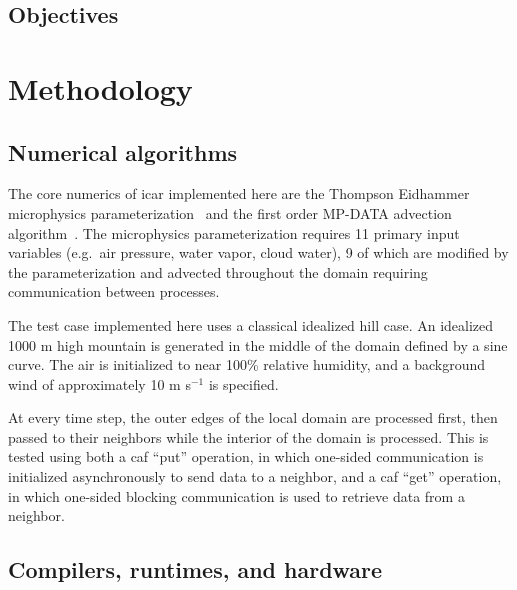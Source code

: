 \subsection{Objectives}

\section{Methodology}
\subsection{Numerical algorithms}
The core numerics of \gls{icar} implemented here are the Thompson Eidhammer microphysics parameterization~\cite{Thompson:2014cw} and the first order MP-DATA advection algorithm~\cite{Smolarkiewicz:1998il}.  
The microphysics parameterization requires 11 primary input variables (e.g.\ air pressure, water vapor, cloud water), 9 of which are modified by the parameterization and advected throughout the domain requiring communication between processes. 

The test case implemented here uses a classical idealized hill case.  
An idealized 1000 m high mountain is generated in the middle of the domain defined by a sine curve. 
The air is initialized to near 100\% relative humidity, and a background wind of approximately 10 m s$^{-1}$ is specified. 

At every time step, the outer edges of the local domain are processed first, 
then passed to their neighbors while the interior of the domain is processed.  
This is tested using both a \gls{caf} ``put'' operation, in which one-sided communication is initialized asynchronously to send data to a neighbor, 
and a \gls{caf} ``get'' operation, in which one-sided blocking communication is used to retrieve data from a neighbor. 

\subsection{Compilers, runtimes, and hardware}


